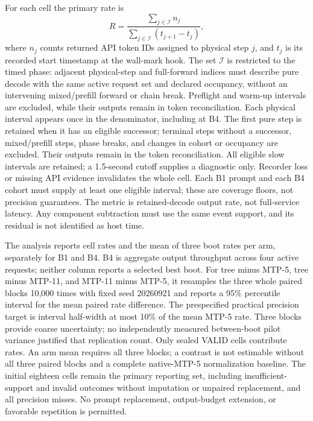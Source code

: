 For each cell the primary rate is
\begin{equation}
 R = \frac{\sum_{j\in\mathcal{I}} n_j}
 {\sum_{j\in\mathcal{I}}(t_{j+1}-t_j)},
\end{equation}
where $n_j$ counts returned API token IDs assigned to physical step $j$, and $t_j$ is its recorded start timestamp at the wall-mark hook. The set $\mathcal{I}$ is restricted to the timed phase: adjacent physical-step and full-forward indices must describe pure decode with the same active request set and declared occupancy, without an intervening mixed/prefill forward or chain break. Preflight and warm-up intervals are excluded, while their outputs remain in token reconciliation. Each physical interval appears once in the denominator, including at B4. The first pure step is retained when it has an eligible successor; terminal steps without a successor, mixed/prefill steps, phase breaks, and changes in cohort or occupancy are excluded. Their outputs remain in the token reconciliation. All eligible slow intervals are retained; a 1.5-second cutoff supplies a diagnostic only. Recorder loss or missing API evidence invalidates the whole cell. Each B1 prompt and each B4 cohort must supply at least one eligible interval; these are coverage floors, not precision guarantees. The metric is retained-decode output rate, not full-service latency. Any component subtraction must use the same event support, and its residual is not identified as host time.

The analysis reports cell rates and the mean of three boot rates per arm, separately for B1 and B4. B4 is aggregate output throughput across four active requests; neither column reports a selected best boot. For tree minus MTP-5, tree minus MTP-11, and MTP-11 minus MTP-5, it resamples the three whole paired blocks 10,000 times with fixed seed 20260921 and reports a 95\% percentile interval for the mean paired rate difference. The prespecified practical precision target is interval half-width at most 10\% of the mean MTP-5 rate. Three blocks provide coarse uncertainty; no independently measured between-boot pilot variance justified that replication count. Only sealed VALID cells contribute rates. An arm mean requires all three blocks; a contrast is not estimable without all three paired blocks and a complete native-MTP-5 normalization baseline. The initial eighteen cells remain the primary reporting set, including insufficient-support and invalid outcomes without imputation or unpaired replacement, and all precision misses. No prompt replacement, output-budget extension, or favorable repetition is permitted.

